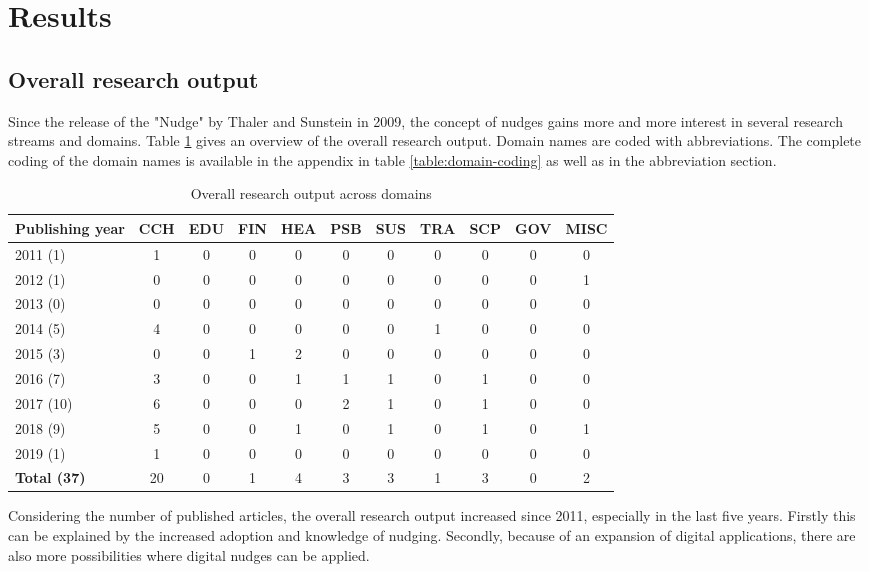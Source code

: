 \section{Results}

\subsection{Overall research output}
Since the release of the "Nudge" by Thaler and Sunstein in 2009, the concept of nudges gains more and more interest in several research streams and domains. Table \ref{table:research-output} gives an overview of the overall research output. Domain names are coded with abbreviations. The complete coding of the domain names is available in the appendix in table \ref{table:domain-coding} as well as in the abbreviation section.

\begin{table}[htbp]
\centering
\small
\begin{tabular}{|l|cccccccccc|}
\hline
\textbf{Publishing year} & \textbf{CCH} & \textbf{EDU} & \textbf{FIN} & \textbf{HEA} & \textbf{PSB} & \textbf{SUS} & \textbf{TRA} & \textbf{SCP} & \textbf{GOV} & \textbf{MISC} \\ \hline
2011 (1) & 1 & 0 & 0 & 0 & 0 & 0 & 0 & 0 & 0 &  0 \\
2012 (1) & 0 & 0 & 0 & 0 & 0 & 0 & 0 & 0 & 0 & 1 \\
2013 (0) & 0 & 0 & 0 & 0 & 0 & 0 & 0 & 0 & 0 & 0 \\
2014 (5) & 4 & 0 & 0 & 0 & 0 & 0 & 1 & 0 & 0 & 0 \\
2015 (3) & 0 & 0 & 1 & 2 & 0 & 0 & 0 & 0 & 0 & 0 \\
2016 (7) & 3 & 0 & 0 & 1 & 1 & 1 & 0 & 1 & 0 & 0 \\
2017 (10) & 6 & 0 & 0 & 0 & 2 & 1 & 0 & 1 & 0 & 0 \\
2018 (9) & 5 & 0 & 0 & 1 & 0 & 1 & 0 & 1 & 0 & 1 \\
2019 (1) & 1 & 0 & 0 & 0 & 0 & 0 & 0 & 0 & 0 & 0 \\ \hline
\textbf{Total (37)} & 20 & 0 & 1 & 4 & 3 & 3 & 1 & 3 & 0 & 2 \\ \hline
\end{tabular}
\caption{Overall research output across domains}
\label{table:research-output}
\end{table}

Considering the number of published articles, the overall research output increased since 2011, especially in the last five years. Firstly this can be explained by the increased adoption and knowledge of nudging. Secondly, because of an expansion of digital applications, there are also more possibilities where digital nudges can be applied.
\\

